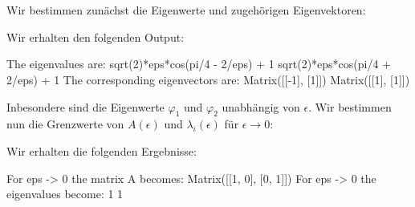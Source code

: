 \section{}

Wir bestimmen zunächst die Eigenwerte und zugehörigen Eigenvektoren:



Wir erhalten den folgenden Output:

\begin{consoleoutput}
The eigenvalues are:
sqrt(2)*eps*cos(pi/4 - 2/eps) + 1
sqrt(2)*eps*cos(pi/4 + 2/eps) + 1
The corresponding eigenvectors are:
Matrix([[-1], [1]])
Matrix([[1], [1]])
\end{consoleoutput}

Inbesondere sind die Eigenwerte $\varphi_1$ und $\varphi_2$ unabhängig von $\epsilon$.
Wir bestimmen nun die Grenzwerte von $A(\epsilon)$ und $\lambda_i(\epsilon)$ für $\epsilon \to 0$:



Wir erhalten die folgenden Ergebnisse:

\begin{consoleoutput}
For eps -> 0 the matrix A becomes:
Matrix([[1, 0], [0, 1]])
For eps -> 0 the eigenvalues become:
1
1
\end{consoleoutput}
